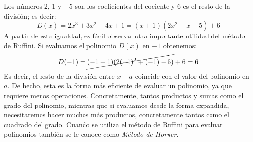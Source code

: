 Los números 2, 1 y $-5$ son los coeficientes del cociente y 6 es el resto de la división; es decir:
\[
D(x)=2x^3+3x^2-4x+1=(x+1)(2x^2+x-5)+6
\]
A partir de esta igualdad, es fácil observar otra importante utilidad del método de Ruffini.
Si evaluamos el polinomio $D(x)$ en $-1$ obtenemos:
\[
D(-1)=\cancel{(-1+1)(2(-1)^2+(-1)-5)}+6= 6
\]
Es decir, el resto de la división entre $x-a$ coincide con el valor del polinomio en $a$.
De hecho, esta es la forma más eficiente de evaluar un polinomio, ya que requiere menos operaciones.
Concretamente, tantos productos y sumas como el grado del polinomio, mientras que si evaluamos desde la forma expandida, necesitaremos hacer muchos más productos, concretamente tantos como el cuadrado del grado.
Cuando se utiliza el método de Ruffini para evaluar polinomios también se le conoce como \emph{Método de Horner}.


